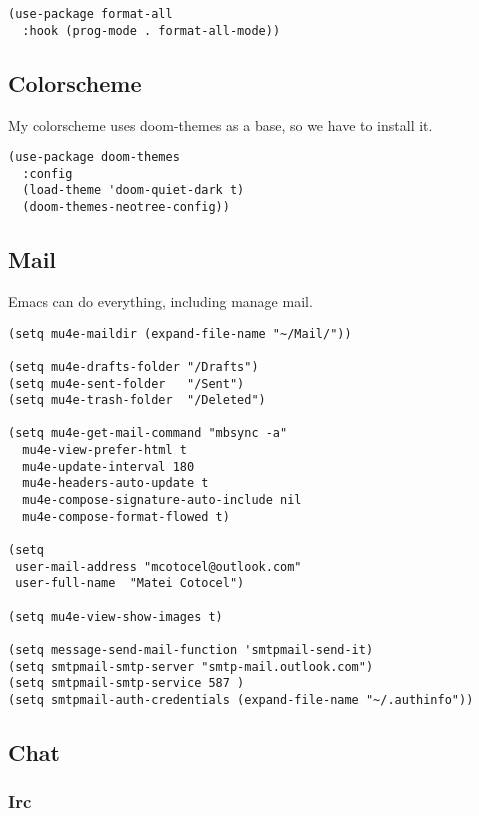 \documentclass[11pt]{article}
\begin{document}
\begin{verbatim}
(use-package format-all
  :hook (prog-mode . format-all-mode))
\end{verbatim}

\subsection*{Colorscheme}
\label{sec:orga0cd7f4}

My colorscheme uses doom-themes as a base, so we have to install it.

\begin{verbatim}
(use-package doom-themes
  :config
  (load-theme 'doom-quiet-dark t)
  (doom-themes-neotree-config))
\end{verbatim}

\subsection*{Mail}
\label{sec:org0ed9a06}

Emacs can do everything, including manage mail.

\begin{verbatim}
(setq mu4e-maildir (expand-file-name "~/Mail/"))

(setq mu4e-drafts-folder "/Drafts")
(setq mu4e-sent-folder   "/Sent")
(setq mu4e-trash-folder  "/Deleted")

(setq mu4e-get-mail-command "mbsync -a"
  mu4e-view-prefer-html t
  mu4e-update-interval 180
  mu4e-headers-auto-update t
  mu4e-compose-signature-auto-include nil
  mu4e-compose-format-flowed t)

(setq
 user-mail-address "mcotocel@outlook.com"
 user-full-name  "Matei Cotocel")

(setq mu4e-view-show-images t)

(setq message-send-mail-function 'smtpmail-send-it)
(setq smtpmail-smtp-server "smtp-mail.outlook.com")
(setq smtpmail-smtp-service 587 )
(setq smtpmail-auth-credentials (expand-file-name "~/.authinfo"))
\end{verbatim}

\subsection*{Chat}
\label{sec:org76c41b9}

\subsubsection*{Irc}
\label{sec:orgdd5c526}
\end{document}
